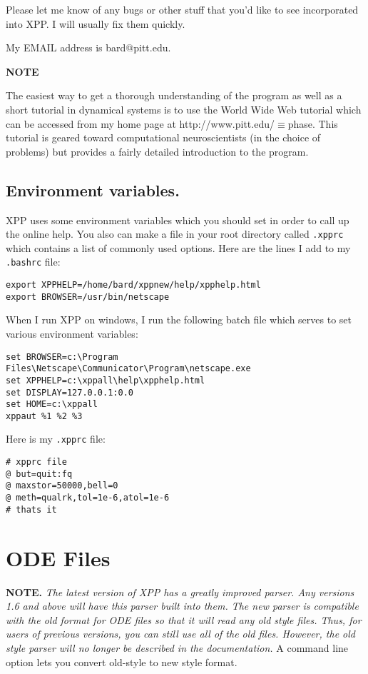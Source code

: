 \documentclass{article}
\newcommand{\tc}[1]{\addcontentsline{toc}{subsection}{#1}}
\begin{document}
Please let me know of any bugs or other stuff that you'd like to see
incorporated into XPP.  I will usually fix them quickly.  
  
My EMAIL address is bard@pitt.edu.
\tc{World Wide Web Tutorial}
\begin{center}
{\bf NOTE}
\end{center}
The easiest way to get a thorough understanding of the program as well
as a short tutorial in dynamical systems is to use the World Wide Web
tutorial which can be accessed from my home page at 
http://www.pitt.edu/$\equiv$phase. This tutorial is geared toward
computational neuroscientists (in the choice of problems) but provides
a fairly detailed introduction to the program.  
\subsection{Environment variables.}
XPP uses some environment variables which you should set in order
to call up the online help. You also can make a file in your root
directory called {\tt .xpprc} which contains a list of commonly used
options. Here are the lines I add to my {\tt .bashrc} file:
\begin{verbatim}
export XPPHELP=/home/bard/xppnew/help/xpphelp.html
export BROWSER=/usr/bin/netscape
\end{verbatim}

When I run XPP on windows, I run the following batch file which serves
to set various environment variables:
\begin{verbatim}
set BROWSER=c:\Program Files\Netscape\Communicator\Program\netscape.exe
set XPPHELP=c:\xppall\help\xpphelp.html
set DISPLAY=127.0.0.1:0.0
set HOME=c:\xppall
xppaut %1 %2 %3
\end{verbatim}


Here is my {\tt .xpprc} file:
\begin{verbatim}
# xpprc file
@ but=quit:fq
@ maxstor=50000,bell=0
@ meth=qualrk,tol=1e-6,atol=1e-6
# thats it
\end{verbatim}


\section{ODE Files}

{\bf NOTE.}  {\em The latest version of XPP has a greatly improved
parser. Any versions 1.6 and above will have this parser built into
them.  The new parser is compatible with the old format for ODE files
so that it will read any old style files.  Thus, for users of previous
versions, you can still use all of the old files.
However, the old style parser will no longer be described in the
documentation.}  A command line option lets you convert old-style to
new style format.
\end{document}
